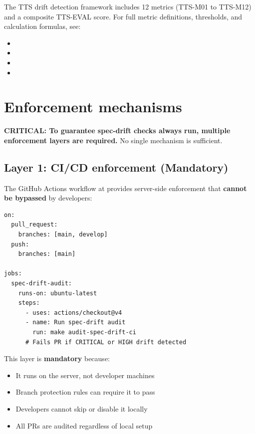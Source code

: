 The TTS drift detection framework includes 12 metrics (TTS-M01 to TTS-M12) and
a composite TTS-EVAL score. For full metric definitions, thresholds, and
calculation formulas, see:

\begin{itemize}
  \item {}
  \item {}
  \item {}
  \item {}
\end{itemize}

\section{Enforcement mechanisms}
\label{sec:enforcement}

\textbf{CRITICAL: To guarantee spec-drift checks always run, multiple
enforcement layers are required.} No single mechanism is sufficient.

\subsection{Layer 1: CI/CD enforcement (Mandatory)}

The GitHub Actions workflow at 
provides server-side enforcement that \textbf{cannot be bypassed} by developers:

\begin{lstlisting}[language=yamlx,caption=CI/CD enforcement configuration]
on:
  pull_request:
    branches: [main, develop]
  push:
    branches: [main]

jobs:
  spec-drift-audit:
    runs-on: ubuntu-latest
    steps:
      - uses: actions/checkout@v4
      - name: Run spec-drift audit
        run: make audit-spec-drift-ci
      # Fails PR if CRITICAL or HIGH drift detected
\end{lstlisting}

This layer is \textbf{mandatory} because:
\begin{itemize}
  \item It runs on the server, not developer machines
  \item Branch protection rules can require it to pass
  \item Developers cannot skip or disable it locally
  \item All PRs are audited regardless of local setup
\end{itemize}

